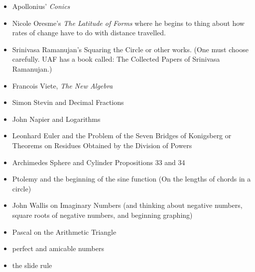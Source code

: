 \documentclass[12pt]{article}
\begin{document}
\begin{itemize}
\item Apollonius' \textit{Conics}
\item Nicole Oresme's \textit{The Latitude of Forms} where he begins to thing about how rates of change have to do with distance travelled.
\item Srinivasa Ramanujan's Squaring the Circle or other works. (One must choose carefully. UAF has a book called: The Collected Papers of Srinivasa Ramanujan.)
\item Francois Viete, \textit{The New Algebra}
\item Simon Stevin and Decimal Fractions
\item John Napier and Logarithms
\item Leonhard Euler and the Problem of the Seven Bridges of Konigsberg or Theorems on Residues Obtained by the Division of Powers
\item Archimedes Sphere and Cylinder Propositions 33 and 34
\item Ptolemy and the beginning of the sine function (On the lengths of chords in a circle)
\item John Wallis on Imaginary Numbers (and thinking about negative numbers, square roots of negative numbers, and beginning graphing)
\item Pascal on the Arithmetic Triangle
\item perfect and amicable numbers
\item the slide rule
\end{itemize}
\end{document}

